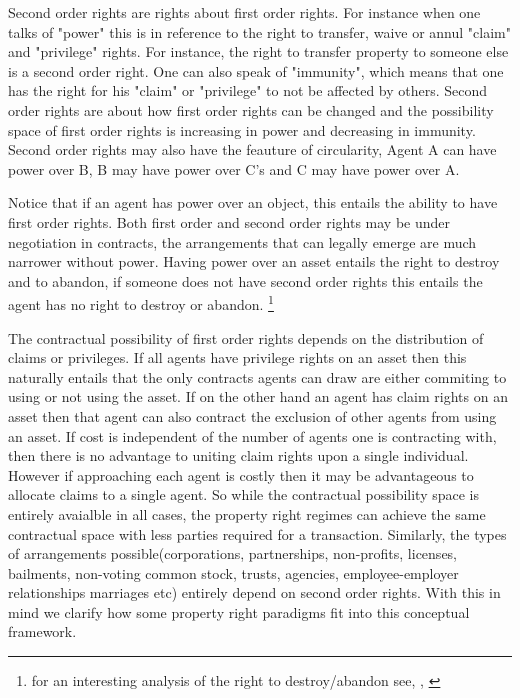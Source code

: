 \documentclass[12pt]{article}
\numberwithin{equation}{section}
\begin{document}
Second order rights are rights about first order rights. For instance when one talks of "power" this is in reference to the right to transfer, waive or annul "claim" and "privilege" rights. For instance, the right to transfer property to someone else is a second order right. One can also speak of "immunity", which means that one has the right for his "claim" or "privilege" to not be affected by others. Second order rights are about how first order rights can be changed and the possibility space of first order rights is increasing in power and decreasing in immunity. Second order rights may also have the feauture of circularity, Agent A can have power over B, B may have power over C's  and C may have power over A.

Notice that if an agent has power over an object, this entails the ability to have first order rights. Both first order and second order rights may be under negotiation in contracts, the arrangements that can legally emerge are much narrower without power. Having power over an asset entails the right to destroy and to abandon, if someone does not have second order rights this entails the agent has no right to destroy or abandon. \footnote{for an interesting analysis of the right to destroy/abandon see, \cite{Strahilevitz2005}, \cite{Strahilevitz2009}}

The contractual possibility of first order rights depends on the distribution of claims or privileges. If all agents have privilege rights on an asset then this naturally entails that the only contracts agents can draw are either commiting to using or not using the asset. If on the other hand an agent has claim rights on an asset then that agent can also contract the exclusion of other agents from using an asset. If cost is independent of the number of agents one is contracting with, then there is no advantage to uniting claim rights upon a single individual. However if approaching each agent is costly then it may be advantageous to allocate claims to a single agent. So while the contractual possibility space is entirely avaialble in all cases, the property right regimes can achieve the same contractual space with less parties required for a transaction. Similarly, the types of arrangements possible(corporations, partnerships, non-profits, licenses, bailments, non-voting common stock, trusts, agencies, employee-employer relationships marriages etc) entirely depend on second order rights. With this in mind we clarify how some property right paradigms fit into this conceptual framework.
\end{document}
